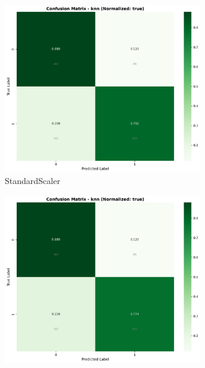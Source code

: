 \begin{figure}[H]\centering
\begin{subfigure}[b]{0.31\textwidth}\centering
\includegraphics[width=0.95\textwidth]{Result/heart_dataset/confusion_matrices/knn_numeric_dataset_StandardScaler.png}
\caption{StandardScaler}\label{fig:knn_heart_cm_standard}
\end{subfigure}\hfill
\begin{subfigure}[b]{0.31\textwidth}\centering
\includegraphics[width=0.95\textwidth]{Result/heart_dataset/confusion_matrices/knn_numeric_dataset_MinMaxScaler.png}

\end{subfigure}
\end{figure}
